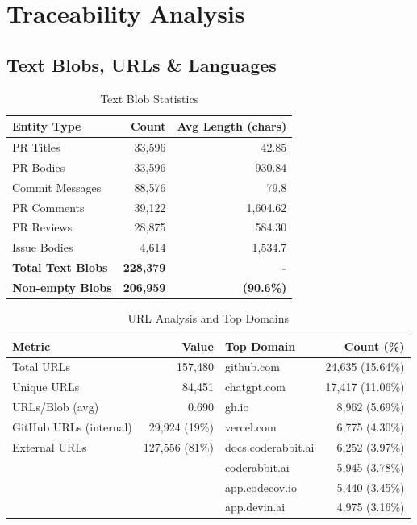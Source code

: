 \documentclass[11pt]{article}
\begin{document}
\section{Traceability Analysis}

\subsection{Text Blobs, URLs \& Languages}

\begin{table}[H]
\centering
\caption{Text Blob Statistics}
\label{tab:text_blobs}
\begin{tabular}{@{}lrr@{}}
\toprule
\textbf{Entity Type} & \textbf{Count} & \textbf{Avg Length (chars)} \\
\midrule
PR Titles & 33,596 & 42.85 \\
PR Bodies & 33,596 & 930.84 \\
Commit Messages & 88,576 & 79.8 \\
PR Comments & 39,122 & 1,604.62 \\
PR Reviews & 28,875 & 584.30 \\
Issue Bodies & 4,614 & 1,534.7 \\
\midrule
\textbf{Total Text Blobs} & \textbf{228,379} & \textbf{-} \\
\textbf{Non-empty Blobs} & \textbf{206,959} & \textbf{(90.6\%)} \\
\bottomrule
\end{tabular}
\end{table}

\begin{table}[H]
\centering
\caption{URL Analysis and Top Domains}
\small
\begin{tabular}{@{}lrlr@{}}
\toprule
\textbf{Metric} & \textbf{Value} & \textbf{Top Domain} & \textbf{Count (\%)} \\
\midrule
Total URLs & 157,480 & github.com & 24,635 (15.64\%) \\
Unique URLs & 84,451 & chatgpt.com & 17,417 (11.06\%) \\
URLs/Blob (avg) & 0.690 & gh.io & 8,962 (5.69\%) \\
GitHub URLs (internal) & 29,924 (19\%) & vercel.com & 6,775 (4.30\%) \\
External URLs & 127,556 (81\%) & docs.coderabbit.ai & 6,252 (3.97\%) \\
 &  & coderabbit.ai & 5,945 (3.78\%) \\
 &  & app.codecov.io & 5,440 (3.45\%) \\
 &  & app.devin.ai & 4,975 (3.16\%) \\
\bottomrule
\end{tabular}
\end{table}
\end{document}

